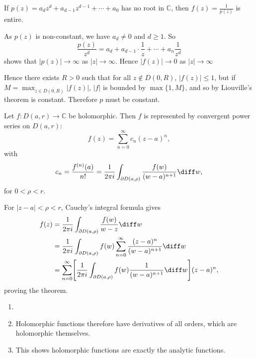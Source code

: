 \documentclass[12pt]{article}
\begin{document}
\begin{proofbox}
	If $p(z) = a_d z^{d} + a_{d-1} z^{d-1} + \cdots + a_0$ has no root in $\mathbb{C}$, then $f(z) = \frac{1}{p(z)}$ is entire.

	As $p(z)$ is non-constant, we have $a_d \neq 0$ and $d \geq 1$. So
	\[
	\frac{p(z)}{z^{d}} = a_d + a_{d-1} \cdot \frac{1}{z} + \cdots + a_n \frac{1}{z^{d}}
	\]
	shows that $|p(z)| \to \infty$ as $|z| \to \infty$. Hence $|f(z)| \to 0$ as $|z| \to \infty$ 

	Hence there exists $R > 0$ such that for all $z \not \in D(0, R)$, $|f(z)| \leq 1$, but if $M = \max_{z \in \overline{D(0,R)}} |f(z)|$, $|f|$ is bounded by $\max\{1, M\}$, and so by Liouville's theorem is constant. Therefore $p$ must be constant.
\end{proofbox}

\begin{theorem}
	Let $f : D(a, r) \to \mathbb{C}$ be holomorphic. Then $f$ is represented by convergent power series on $D(a, r)$:
	\[
	f(z) = \sum_{n = 0}^{\infty} c_n (z - a)^{n}
	,\]
	with
	\[
	c_n = \frac{f^{(n)}(a)}{n!} = \frac{1}{2 \pi i} \int_{\partial D(a, \rho)} \frac{f(w)}{(w - a)^{n+1}} \diff w
	,\]
	for $0 < \rho < r$.
\end{theorem}

\begin{proofbox}
	For $|z - a| < \rho < r$, Cauchy's integral formula gives
	\begin{align*}
		f(z) &= \frac{1}{2 \pi i} \int_{\partial D(a, \rho)} \frac{f(w)}{w - z} \diff w \\
		     &= \frac{1}{2 \pi i} \int_{\partial D(a, \rho)}f(w) \sum_{n = 0}^{\infty} \frac{(z - a)^{n}}{(w - a)^{n+1}} \diff w \\
		     &= \sum_{n = 0}^{\infty}\Biggl[ \frac{1}{2 \pi i} \int_{\partial D(a, \rho)}f(w) \frac{1}{(w - a)^{n+1}} \diff w \Biggr] (z - a)^{n},
	\end{align*}
	proving the theorem.
\end{proofbox}

\begin{remark}
	\begin{enumerate}
		\item[]
		\item Holomorphic functions therefore have derivatives of all orders, which are holomorphic themselves.
		\item This shows holomorphic functions are exactly the analytic functions.
	\end{enumerate}
\end{remark}
\end{document}
